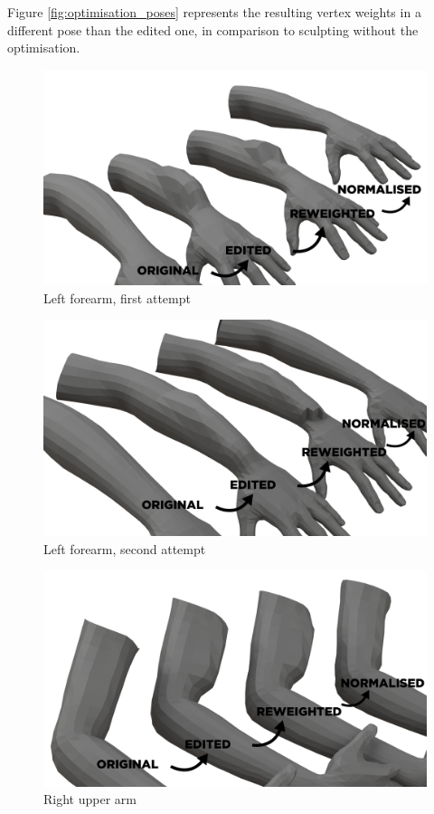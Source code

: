 \documentclass[12pt,twoside]{report}
\begin{document}
Figure \ref{fig:optimisation_poses} represents the resulting vertex weights in a different pose than the edited one, in comparison to sculpting without the optimisation.

\begin{figure}[hp]
    \centering
    \includegraphics[width=65ex]{graphics/result_forearm_l.png}
    \caption{Left forearm, first attempt}
    \label{fig:result_forearm_l}
\end{figure}

\begin{figure}[hp]
    \centering
    \includegraphics[width=65ex]{graphics/result_forearm_l_2.png}
    \caption{Left forearm, second attempt}
    \label{fig:result_forearm_l_2}
\end{figure}

\begin{figure}[hp]
    \centering
    \includegraphics[width=65ex]{graphics/result_upperarm_r.png}
    \caption{Right upper arm}
    \label{fig:result_upperarm_r}
\end{figure}
\end{document}
